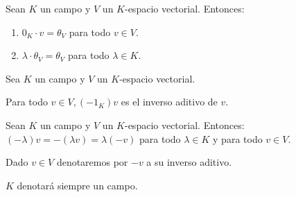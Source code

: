 \begin{proposition}{}{}
    Sean $K$ un campo y $V$ un $K$-espacio vectorial. Entonces:
    \begin{enumerate}
        \item $0_K \cdot v = \theta_V$ para todo $v\in V$.
        \item $\lambda \cdot \theta_V = \theta_V$ para todo $\lambda \in K$.
    \end{enumerate}
\end{proposition}
\begin{proposition}{}{}
    Sea $K$ un campo y $V$ un $K$-espacio vectorial. 
    
    Para todo $v\in V, (-1_K)v$ es el inverso aditivo de $v$.
\end{proposition}
\begin{corollary}{}{}
    Sean $K$ un campo y $V$ un $K$-espacio vectorial. Entonces:
    $(-\lambda)v = - (\lambda v) = \lambda (-v)$ para todo $\lambda \in K$ y para todo $v\in V$.
\end{corollary}


\begin{notation}{}{}
    Dado $v \in V$ denotaremos por $-v$ a su inverso aditivo.
\end{notation}
\begin{notation}{}{}
    $K$ denotará siempre un campo.
\end{notation}

